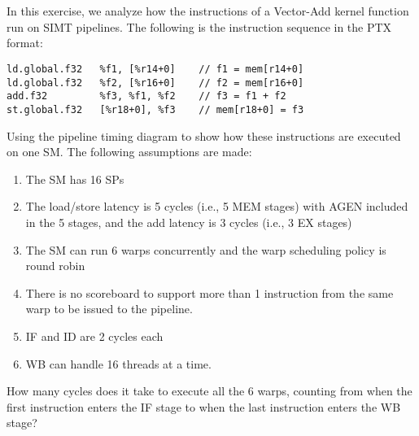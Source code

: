 \documentclass[11pt]{article}
\begin{document}
\section{}

In this exercise, we analyze how the instructions of a Vector-Add kernel function run on SIMT pipelines. The following is the instruction sequence in the PTX format:

\begin{verbatim}
ld.global.f32   %f1, [%r14+0]    // f1 = mem[r14+0]
ld.global.f32   %f2, [%r16+0]    // f2 = mem[r16+0]
add.f32         %f3, %f1, %f2    // f3 = f1 + f2
st.global.f32   [%r18+0], %f3    // mem[r18+0] = f3 
\end{verbatim}

Using the pipeline timing diagram to show how these instructions are executed on one SM. The following assumptions are made: 

\begin{enumerate}
	\item The SM has 16 SPs
	\item The load/store latency is 5 cycles (i.e., 5 MEM stages) with AGEN included in the 5 stages, and the add latency is 3 cycles (i.e., 3 EX stages)
	\item The SM can run 6 warps concurrently and the warp scheduling policy is round robin
	\item There is no scoreboard to support more than 1 instruction from the same warp to be issued to the pipeline. 
	\item IF and ID are 2 cycles each
	\item WB can handle 16 threads at a time.
\end{enumerate}

How many cycles does it take to execute all the 6 warps, counting from when the first instruction enters the IF stage to when the last instruction enters the WB stage?
\end{document}
